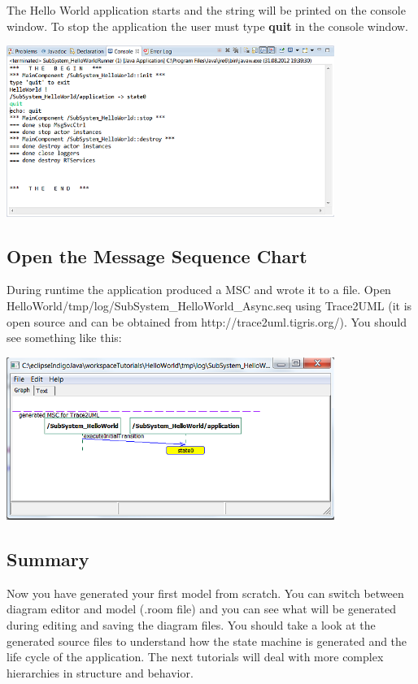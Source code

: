 The Hello World application starts and the string will be printed on the console window. To stop the 
application the user must type \textbf{quit} in the console window.

\includegraphics[width=0.8\textwidth]{images/015-HelloWorld08.png}

\subsection{Open the Message Sequence Chart}

During runtime the application produced a MSC and wrote it to a file. Open 
HelloWorld/tmp/log/SubSystem\_HelloWorld\_Async.seq using Trace2UML (it is open source and can be obtained 
from  http://trace2uml.tigris.org/). You should see something like this:

\includegraphics[width=0.8\textwidth]{images/015-HelloWorld09.png}


\subsection{Summary}

Now you have generated your first \eTrice{} model from scratch. You can switch between diagram editor and 
model (.room file) and you can see what will be generated during editing and saving the diagram files. 
You should take a look at the generated source files to understand how the state machine is generated and 
the life cycle of the application. The next tutorials will deal with more complex hierarchies in structure 
and behavior.
